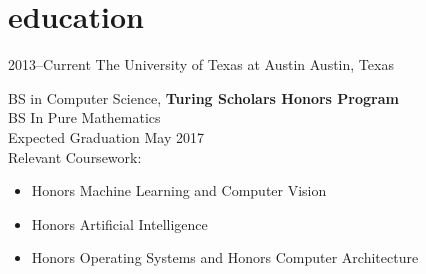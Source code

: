 \documentclass{friggeri-cv}
\begin{document}

\vspace{-1cm}
\section{education}
\begin{entrylist}
\entry%
{2013--Current}
{The University of Texas at Austin}
{Austin, Texas}
{BS in Computer Science, \textbf{Turing Scholars Honors Program}\\BS In Pure
Mathematics\\Expected Graduation May 2017\\
Relevant Coursework:
\begin{itemize}
    \item Honors Machine Learning and Computer Vision
    \item Honors Artificial Intelligence
    \item Honors Operating Systems and Honors Computer Architecture
\end{itemize}}
\end{entrylist}
\vspace{-0.5cm}
\end{document}
